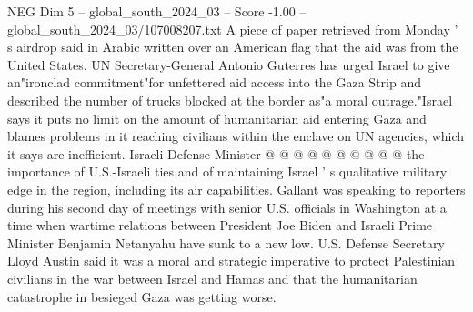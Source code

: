 \begin{textsample}{NEG Dim 5 – global\_south\_2024\_03 – Score -1.00 – global\_south\_2024\_03/107008207.txt}
A piece of paper retrieved from Monday ' s airdrop said in Arabic written over an American flag that the aid was from the United States.
UN Secretary-General Antonio Guterres has urged Israel to give an"ironclad commitment"for unfettered aid access into the Gaza Strip and described the number of trucks blocked at the border as"a moral outrage."Israel says it puts no limit on the amount of humanitarian aid entering Gaza and blames problems in it reaching civilians within the enclave on UN agencies, which it says are inefficient.
Israeli Defense Minister @ @ @ @ @ @ @ @ @ @ the importance of U.S.-Israeli ties and of maintaining Israel ' s qualitative military edge in the region, including its air capabilities.
Gallant was speaking to reporters during his second day of meetings with senior U.S. officials in Washington at a time when wartime relations between President Joe Biden and Israeli Prime Minister Benjamin Netanyahu have sunk to a new low.
U.S.
Defense Secretary Lloyd Austin said it was a moral and strategic imperative to protect Palestinian civilians in the war between Israel and Hamas and that the humanitarian catastrophe in besieged Gaza was getting worse.

\end{textsample}
